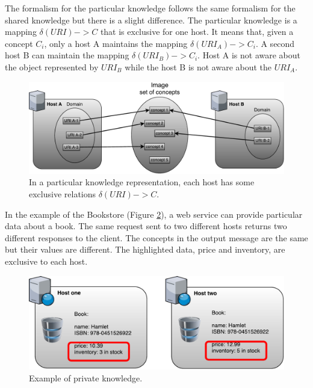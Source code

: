 \documentclass{singlecol-new}
\theoremstyle{TH}{
\newtheorem{lemma}{Lemma}
\newtheorem{theorem}[lemma]{Theorem}
\newtheorem{corrolary}[lemma]{Corrolary}
\newtheorem{conjecture}[lemma]{Conjecture}
\newtheorem{proposition}[lemma]{Proposition}
\newtheorem{claim}[lemma]{Claim}
\newtheorem{stheorem}[lemma]{Wrong Theorem}
\newtheorem{algorithm}{Algorithm}
}
\theoremstyle{THrm}{
\newtheorem{definition}{Definition}[section]
\newtheorem{question}{Question}[section]
\newtheorem{remark}{Remark}
\newtheorem{scheme}{Scheme}
}
\theoremstyle{THhit}{
\newtheorem{case}{Case}[section]
}
\begin{document}
The formalism for the particular knowledge follows the same formalism for the shared knowledge but there is a slight difference. The particular knowledge is a mapping $\delta(URI) -> C$ that is exclusive for one host. It means that, given a concept $C_i$, only a host A maintains the mapping $\delta(URI_A) -> C_i$. A second host B can maintain the mapping $\delta(URI_B) -> C_i$. Host A is not aware about the object represented by $URI_B$ while the host B is not aware about the $URI_A$.

\begin{figure}[!htb]
	\includegraphics[scale=.45]{images/conjunto-interpretacao-particular.pdf}
	\centering
	\caption{In a particular knowledge representation, each host has some exclusive relations $\delta(URI) -> C$.}
	\label{fig:particularknowledge}
\end{figure} 

In the example of the Bookstore (Figure \ref{fig:bookprivateknowledge}), a web service can provide particular data about a book. The same request sent to two different hosts returns two different responses to the client. The concepts in the output message are the same but their values are different. The highlighted data, price and inventory, are exclusive to each host. 

\begin{figure}[!b]
	\includegraphics[scale=.6]{images/Book-private-knowlege.pdf}
	\centering
	\caption{Example of private knowledge.}
	\label{fig:bookprivateknowledge}
\end{figure}
\end{document}
